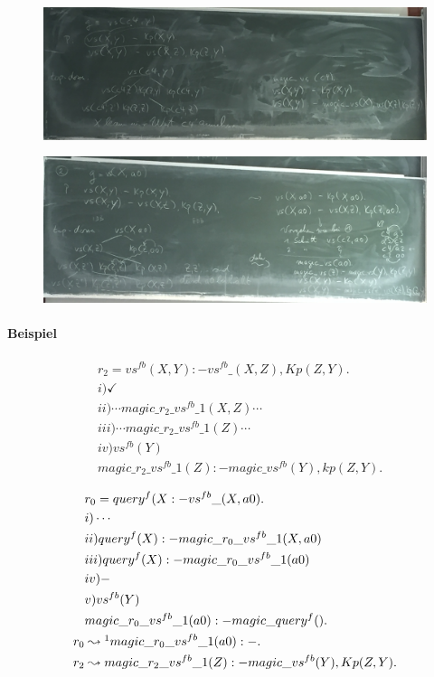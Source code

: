 \documentclass[12pt, a4paper]{article}
\begin{document}
\begin{figure}
\centering
\includegraphics[width=0.95\linewidth]{img/img13}
\caption{}
\label{fig:img13}
\end{figure}

\begin{figure}
\centering
\includegraphics[width=0.95\linewidth]{img/img14}
\caption{}
\label{fig:img14}
\end{figure}

\paragraph{Beispiel}

\begin{align*}
&r_2 = vs^{fb}(X,Y) :- vs^{fb}\_(X,Z), Kp(Z,Y). \\
&i) \checkmark \\
&ii) \cdots magic\_r_2\_vs^{fb}\_1(X,Z) \cdots \\
&iii) \cdots magic\_r_2\_vs^{fb}\_1(Z) \cdots \\
&iv) vs^{fb}(Y)\\
& magic\_r_2\_vs^{fb}\_1(Z) :- magic\_vs^{fb}(Y), kp(Z,Y).
\end{align*}


\begin{align*}
&r_0 = query^f(X :- vs^{fb}\_(X,a0). \\
&i) \cdots \\
&ii) query^f(X) :- magic\_r_0\_vs^{fb}\_1(X,a0) \\
&iii) query^f(X) :- magic\_r_0\_vs^{fb}\_1(a0) \\
&iv) - \\
&v) vs^{fb}(Y)\\
& magic\_r_0\_vs^{fb}\_1(a0) :- magic\_query^f().\\
r_0 &\leadsto\footnotemark magic\_r_0\_vs^{fb}\_1(a0) :- . \\
r_2 &\leadsto magic\_r_2\_vs^{fb}\_1(Z) :- magic\_vs^{fb}(Y), Kp(Z,Y).
\end{align*}
\end{document}
